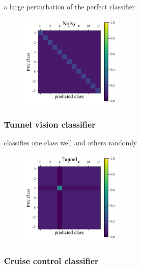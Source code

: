 a large perturbation of the perfect classifier

\begin{figure}
	\begin{center}
		\includegraphics[width=0.45\textwidth]{./fig/Noisy.png}\\
		\caption{}
		\label{fig:noisy_data}
	\end{center}
\end{figure}

\subsubsection{Tunnel vision classifier}
\label{sec:tunnel_data}

classifies one class well and others randomly

\begin{figure}
	\begin{center}
		\includegraphics[width=0.45\textwidth]{./fig/Tunnel.png}\\
		\caption{}
		\label{fig:tunnel_data}
	\end{center}
\end{figure}

\subsubsection{Cruise control classifier}
\label{sec:cruise_data}

